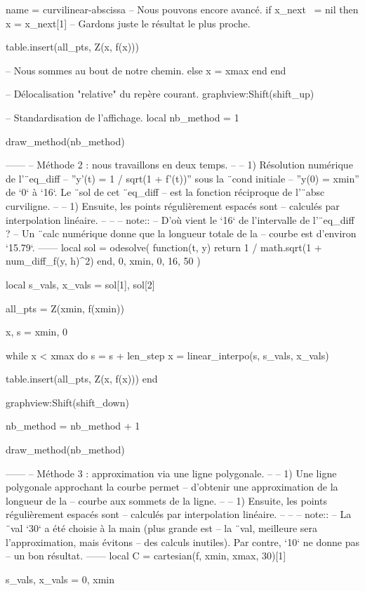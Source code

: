 \documentclass{standalone}
\begin{document}
\begin{luadraw}{name = curvilinear-abscissa}
-- Nous pouvons encore avancé.
  if x_next ~= nil then
    x = x_next[1]  -- Gardons juste le résultat le plus proche.

    table.insert(all_pts, Z(x, f(x)))

-- Nous sommes au bout de notre chemin.
  else
    x = xmax
  end
end

-- Délocalisation "relative" du repère courant.
graphview:Shift(shift_up)

-- Standardisation de l'affichage.
local nb_method = 1

draw_method(nb_method)

------
-- Méthode 2 : nous travaillons en deux temps.
--
--     1) Résolution numérique de l'¨eq_diff
--     ''y'(t) = 1 / sqrt(1 + f'(t))'' sous la ¨cond initiale
--     ''y(0) = xmin'' de `0` à `16`. Le ¨sol de cet ¨eq_diff
--     est la fonction réciproque de l'¨absc curviligne.
--
--     1) Ensuite, les points régulièrement espacés sont
--     calculés par interpolation linéaire.
--
--
-- note::
--     D'où vient le `16` de l'intervalle de l'¨eq_diff ?
--     Un ¨calc numérique donne que la longueur totale de la
--     courbe est d'environ `15.79`.
------
local sol = odesolve(
  function(t, y)
    return 1 / math.sqrt(1 + num_diff_f(y, h)^2)
  end,
  0, xmin,
  0, 16,
  50
)

local s_vals, x_vals = sol[1], sol[2]

all_pts = {Z(xmin, f(xmin))}

x, s = xmin, 0

while x < xmax do
  s = s + len_step
  x = linear_interpo(s, s_vals, x_vals)

  table.insert(all_pts, Z(x, f(x)))
end

graphview:Shift(shift_down)

nb_method = nb_method + 1

draw_method(nb_method)

------
-- Méthode 3 : approximation via une ligne polygonale.
--
--     1) Une ligne polygonale approchant la courbe permet
--     d'obtenir une approximation de la longueur de la
--     courbe aux sommets de la ligne.
--
--     1) Ensuite, les points régulièrement espacés sont
--     calculés par interpolation linéaire.
--
--
-- note::
--     La ¨val `30` a été choisie à la main (plus grande est
--     la ¨val, meilleure sera l'approximation, mais évitons
--     des calculs inutiles). Par contre, `10` ne donne pas
--     un bon résultat.
------
local C = cartesian(f, xmin, xmax, 30)[1]

s_vals, x_vals = {0}, {xmin}


\end{luadraw}
\end{document}
